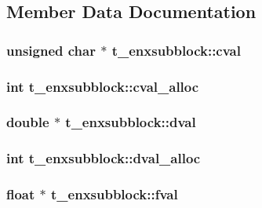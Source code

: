 \subsection{\-Member \-Data \-Documentation}
\hypertarget{structt__enxsubblock_af84da87395c021c30d38c3295e643c3e}{
\subsubsection[{cval}]{\setlength{\rightskip}{0pt plus 5cm}unsigned char $\ast$ {\bf t\-\_\-enxsubblock\-::cval}}}\label{structt__enxsubblock_af84da87395c021c30d38c3295e643c3e}
\hypertarget{structt__enxsubblock_a6d537b04e9d28aecc0728ced432a8f6f}{
\subsubsection[{cval\-\_\-alloc}]{\setlength{\rightskip}{0pt plus 5cm}int {\bf t\-\_\-enxsubblock\-::cval\-\_\-alloc}}}\label{structt__enxsubblock_a6d537b04e9d28aecc0728ced432a8f6f}
\hypertarget{structt__enxsubblock_a361d049e17c6f640cb0ec5b0e65756ee}{
\subsubsection[{dval}]{\setlength{\rightskip}{0pt plus 5cm}double $\ast$ {\bf t\-\_\-enxsubblock\-::dval}}}\label{structt__enxsubblock_a361d049e17c6f640cb0ec5b0e65756ee}
\hypertarget{structt__enxsubblock_a209ba54f6bda312d5f846cfe1d628865}{
\subsubsection[{dval\-\_\-alloc}]{\setlength{\rightskip}{0pt plus 5cm}int {\bf t\-\_\-enxsubblock\-::dval\-\_\-alloc}}}\label{structt__enxsubblock_a209ba54f6bda312d5f846cfe1d628865}
\hypertarget{structt__enxsubblock_aefb348e22ff40a97367007f478b86873}{
\subsubsection[{fval}]{\setlength{\rightskip}{0pt plus 5cm}float $\ast$ {\bf t\-\_\-enxsubblock\-::fval}}}\label{structt__enxsubblock_aefb348e22ff40a97367007f478b86873}
